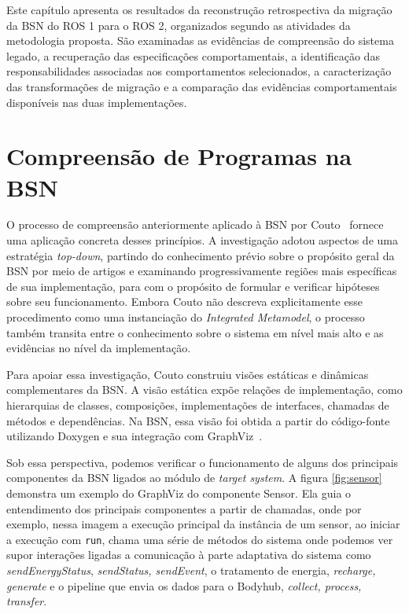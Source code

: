 \label{cap:resultados}
Este capítulo apresenta os resultados da reconstrução retrospectiva da migração da BSN do ROS 1 para o ROS 2, organizados segundo as atividades da metodologia proposta. São examinadas as evidências de compreensão do sistema legado, a recuperação das especificações comportamentais, a identificação das responsabilidades associadas aos comportamentos selecionados, a caracterização das transformações de migração e a comparação das evidências comportamentais disponíveis nas duas implementações.

\section{Compreensão de Programas na BSN}
\label{sec:compreensao-res}

O processo de compreensão anteriormente aplicado à BSN por Couto~\cite{tgsamuelcouto} fornece uma aplicação concreta desses princípios. A investigação adotou aspectos de uma estratégia \textit{top-down}, partindo do conhecimento prévio sobre o propósito geral da BSN por meio de artigos e examinando progressivamente regiões mais específicas de sua implementação, para com o propósito de formular e verificar hipóteses sobre seu funcionamento. Embora Couto não descreva explicitamente esse procedimento como uma instanciação do \textit{Integrated Metamodel}, o processo também transita entre o conhecimento sobre o sistema em nível mais alto e as evidências no nível da implementação.

Para apoiar essa investigação, Couto construiu visões estáticas e dinâmicas complementares da BSN. A visão estática expõe relações de implementação, como hierarquias de classes, composições, implementações de interfaces, chamadas de métodos e dependências. Na BSN, essa visão foi obtida a partir do código-fonte utilizando Doxygen e sua integração com GraphViz~\cite{tgsamuelcouto}. 

Sob essa perspectiva, podemos verificar o funcionamento de alguns dos principais componentes da BSN ligados ao módulo de \textit{target system}. A figura \ref{fig:sensor} demonstra um exemplo do GraphViz do componente Sensor. Ela guia o entendimento dos principais componentes a partir de chamadas, onde por exemplo, nessa imagem a execução principal da instância de um sensor, ao iniciar a execução com \texttt{run}, chama uma série de métodos do sistema onde podemos ver supor interações ligadas a comunicação à parte adaptativa do sistema como \textit{sendEnergyStatus}, \textit{sendStatus, sendEvent}, o tratamento de energia, \textit{recharge, generate} e o pipeline que envia os dados para o Bodyhub, \textit{collect, process, transfer}.

